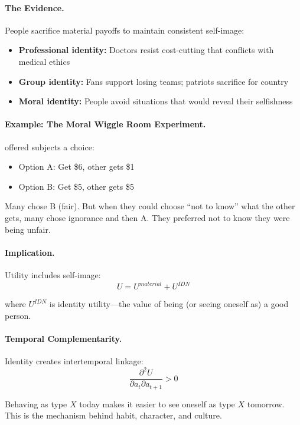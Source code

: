 \paragraph{The Evidence.}
People sacrifice material payoffs to maintain consistent self-image:
\begin{itemize}
  \item \textbf{Professional identity:} Doctors resist cost-cutting that conflicts with medical ethics
  \item \textbf{Group identity:} Fans support losing teams; patriots sacrifice for country
  \item \textbf{Moral identity:} People avoid situations that would reveal their selfishness
\end{itemize}

\paragraph{Example: The Moral Wiggle Room Experiment.}
\citet{danaberton2007} offered subjects a choice:
\begin{itemize}
  \item Option A: Get \$6, other gets \$1
  \item Option B: Get \$5, other gets \$5
\end{itemize}

Many chose B (fair). But when they could choose ``not to know'' what the other gets,
many chose ignorance and then A. They preferred not to know they were being unfair.

\paragraph{Implication.}
Utility includes self-image:
\begin{equation}
  U = U^{material} + U^{IDN}
\end{equation}

where $U^{IDN}$ is identity utility---the value of being (or seeing oneself as) a good person.

\paragraph{Temporal Complementarity.}
Identity creates intertemporal linkage:
\begin{equation}
  \frac{\partial^2 U}{\partial a_t \partial a_{t+1}} > 0
\end{equation}

Behaving as type $X$ today makes it easier to see oneself as type $X$ tomorrow.
This is the mechanism behind habit, character, and culture.

